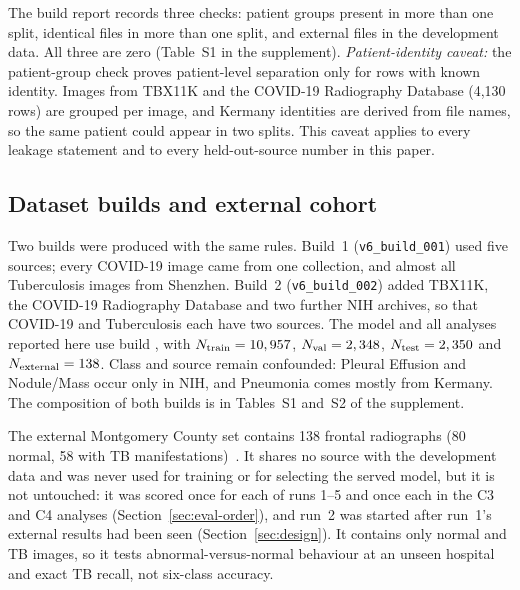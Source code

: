 The build report records three checks: patient groups present in more than one split, identical files in more than one split, and external files in the development data. All three are zero (Table~S1 in the supplement). \emph{Patient-identity caveat:} the patient-group check proves patient-level separation only for rows with known identity. Images from TBX11K and the COVID-19 Radiography Database (4,130 rows) are grouped per image, and Kermany identities are derived from file names, so the same patient could appear in two splits. This caveat applies to every leakage statement and to every held-out-source number in this paper.

\subsection{Dataset builds and external cohort}
\label{sec:builds}
Two builds were produced with the same rules. Build~1 (\texttt{v6\_build\_001}) used five sources; every COVID-19 image came from one collection, and almost all Tuberculosis images from Shenzhen. Build~2 (\texttt{v6\_build\_002}) added TBX11K, the COVID-19 Radiography Database and two further NIH archives, so that COVID-19 and Tuberculosis each have two sources. The model and all analyses reported here use build \RDatasetBuild, with $N_{\text{train}}=10,957$, $N_{\text{val}}=2,348$, $N_{\text{test}}=2,350$ and $N_{\text{external}}=138$. Class and source remain confounded: Pleural Effusion and Nodule/Mass occur only in NIH, and Pneumonia comes mostly from Kermany. The composition of both builds is in Tables~S1 and~S2 of the supplement.

The external Montgomery County set contains 138 frontal radiographs (80 normal, 58 with TB manifestations)~\cite{jaeger2014two,candemir2014lung}. It shares no source with the development data and was never used for training or for selecting the served model, but it is not untouched: it was scored once for each of runs 1--5 and once each in the C3 and C4 analyses (Section~\ref{sec:eval-order}), and run~2 was started after run~1's external results had been seen (Section~\ref{sec:design}). It contains only normal and TB images, so it tests abnormal-versus-normal behaviour at an unseen hospital and exact TB recall, not six-class accuracy.

